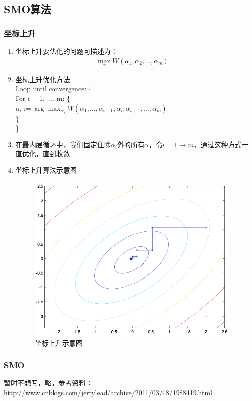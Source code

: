 \subsection{SMO算法}

\subsubsection{坐标上升}
\begin{enumerate}
	\item 坐标上升要优化的问题可描述为：
	\begin{align}
		\max_{\alpha}W(\alpha_1, \alpha_2, \dots, \alpha_m)
	\end{align}
	\item 坐标上升优化方法 \\ 
	Loop until convergence: \{ \\
		For i = 1, ..., m: \{ \\
			$\alpha_i := \arg \max_{\hat{\alpha_i}}W(\alpha_1, \dots, \alpha_{i-1}, \alpha_i, \alpha_{i+1}, \dots, \alpha_m)$ \\
		\} \\
	\} 
	\item 在最内层循环中，我们固定住除$\alpha_i$外的所有$\alpha$，令$i=1 \to m$，通过这种方式一直优化，直到收敛
	\item 坐标上升算法示意图
	\begin{figure}[htbp]
		\centering
		\includegraphics[scale=0.8]{./images/坐标上升}
		\caption{坐标上升示意图}
	\end{figure}
\end{enumerate}


\subsubsection{SMO}
暂时不想写，略，参考资料：\url{http://www.cnblogs.com/jerrylead/archive/2011/03/18/1988419.html}

